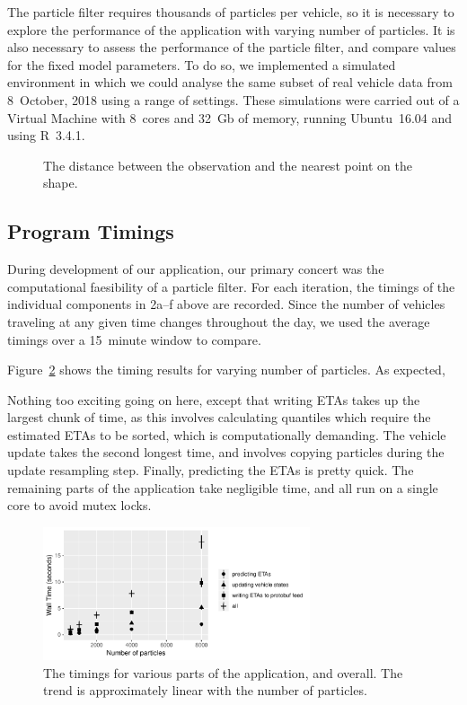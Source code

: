 The particle filter requires thousands of particles per vehicle,
so it is necessary to explore the performance of the application
with varying number of particles.
It is also necessary to assess the performance of the particle filter,
and compare values for the fixed model parameters.
To do so, we implemented a simulated \rt environment
in which we could analyse the same subset of real vehicle data from 8~October, 2018
using a range of settings.
These simulations were carried out of a Virtual Machine 
with 8~cores and 32~Gb of memory, 
running Ubuntu~16.04 and using R~3.4.1.

\begin{figure}[tb]
    \centering
    \caption{The distance between the observation and the nearest point on the shape.}
    \label{fig:gps_dist}
\end{figure}



\subsection{Program Timings}
\label{sec:timings}

During development of our application,
our primary concert was the computational faesibility of a particle filter.
For each iteration, 
the timings of the individual components in 2a--f above are recorded.
Since the number of vehicles traveling at any given time changes throughout the day,
we used the average timings over a 15~minute window to compare.


Figure~\ref{fig:timings} shows the timing results for varying number of particles.
As expected, 

Nothing too exciting going on here, 
except that writing ETAs takes up the largest chunk of time,
as this involves calculating quantiles which require the estimated ETAs to be sorted,
which is computationally demanding. 
The vehicle update takes the second longest time,
and involves copying particles during the update resampling step.
Finally, predicting the ETAs is pretty quick.
The remaining parts of the application take negligible time,
and all run on a single core to avoid mutex locks.



\begin{figure}[tb]
    \centering
    \includegraphics[width=0.7\textwidth]{figures/04_model_results_timing.pdf}
    \caption{The timings for various parts of the application, and overall. %
        The trend is approximately linear with the number of particles.}
    \label{fig:timings}
\end{figure}





